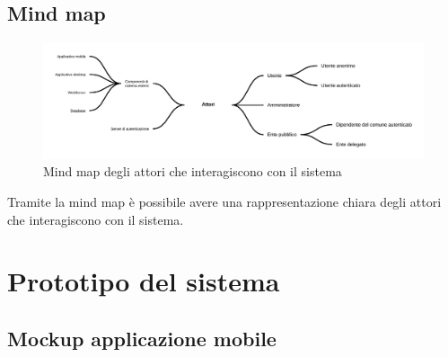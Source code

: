 \documentclass{article}
\begin{document}
\vspace{20pt}

\subsection{Mind map}

\begin{figure}[htbp]
    \label{fig:Mind_map}
    \centering
    \includegraphics[width=1\textwidth]{Images/MindMap.png}
    \caption{Mind map degli attori che interagiscono con il sistema}
\end{figure}

Tramite la mind map è possibile avere una rappresentazione chiara degli attori che interagiscono con il sistema.\\
\clearpage

\section{Prototipo del sistema}

\subsection{Mockup applicazione mobile}
\end{document}
